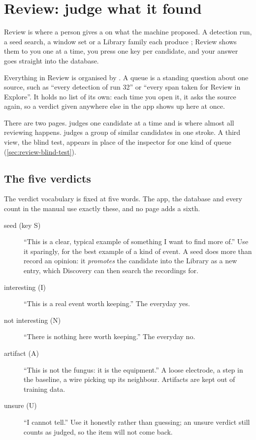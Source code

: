 \chapter{Review: judge what it found}\label{ch:review}
Review is where a person gives a  on what the machine proposed. A
detection run, a seed search, a window set or a Library family each produce
; Review shows them to you one at a time, you press one key per
candidate, and your answer goes straight into the database.

Everything in Review is organised by . A queue is a standing
question about one source, such as ``every detection of run 32'' or ``every span taken for
Review in Explore''. It holds no list of its own: each time you open it, it asks the source
again, so a verdict given anywhere else in the app shows up here at once.

There are two pages.  judges one candidate at a time and is where
almost all reviewing happens.  judges a group of similar candidates
in one stroke. A third view, the blind test, appears in place of the inspector for one kind
of queue (\cref{sec:review-blind-test}).

\section{The five verdicts}\label{sec:review-verdicts}
The verdict vocabulary is fixed at five words. The app, the database and every count in
the manual use exactly these, and no page adds a sixth.

\begin{description}
  \item[seed (key S)] ``This is a clear, typical example of something I want to find more
    of.'' Use it sparingly, for the best example of a kind of event. A seed does more than
    record an opinion: it \emph{promotes} the candidate into the Library as a new
     entry, which Discovery can then search the recordings for.
  \item[interesting (I)] ``This is a real event worth keeping.'' The everyday yes.
  \item[not interesting (N)] ``There is nothing here worth keeping.'' The everyday no.
  \item[artifact (A)] ``This is not the fungus: it is the equipment.'' A loose electrode, a
    step in the baseline, a wire picking up its neighbour. Artifacts are kept out of
    training data.
  \item[unsure (U)] ``I cannot tell.'' Use it honestly rather than guessing; an unsure
    verdict still counts as judged, so the item will not come back.
\end{description}

